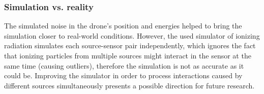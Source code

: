 \subsubsection{Simulation vs. reality}
The simulated noise in the drone's position and energies helped to bring the simulation closer to real-world conditions.
However, the used simulator of ionizing radiation simulates each source-sensor pair independently, which ignores the fact that ionizing particles from multiple sources might interact in the sensor at the same time (causing outliers), therefore the simulation is not as accurate as it could be.
Improving the simulator in order to process interactions caused by different sources simultaneously presents a possible direction for future research.

\begin{figure}[!htb]%
  \centering
  \newline
  \noindent
\end{figure}
